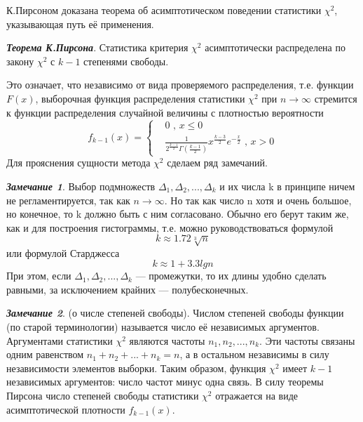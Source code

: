 \documentclass[12pt]{article}
\begin{document}
	К.Пирсоном доказана теорема об асимптотическом поведении статистики $\chi^{2}$, указывающая путь её применения.
	
	\textbf{\textit{Теорема К.Пирсона}}. Статистика критерия $\chi^{2}$ асимптотически распределена по закону $\chi^{2}$ с $k-1$ степенями свободы.
	
	Это означает, что независимо от вида проверяемого распределения, т.е. функции $F(x)$, выборочная функция распределения статистики $\chi^{2}$ при $n \rightarrow \infty$  стремится к функции распределения случайной величины с плотностью вероятности 
	\begin{equation}
		f_{k - 1}(x) = 
		\begin{cases}
			& 0 \text{ , } x  \leq 0  \\ 
			& \frac{1}{2^{\frac{k-1}{2}}\Gamma(\frac{k-1}{2})}x^{\frac{k-3}{2}}e^{-\frac{x}{2}}
			\text{ , } x>0 
		\end{cases}
		\label{f_k-1}
	\end{equation}
	Для прояснения сущности метода $\chi^{2}$ сделаем ряд замечаний.
	
	\textbf{\textit{Замечание 1}}. Выбор подмножеств $\Delta_{1},\Delta_{2}, ... ,\Delta_{k}$ и их числа k в принципе ничем не регламентируется, так как $n \rightarrow \infty$. Но так как число n хотя и очень большое, но конечное, то k должно быть с ним согласовано. Обычно его берут таким же, как и для построения гистограммы, т.е. можно руководствоваться формулой
	\begin{equation}
		k \approx 1.72\sqrt[3]{n}
		\label{k_1}
	\end{equation}
	или формулой Старджесса
	\begin{equation}
		k \approx 1 + 3.3lgn
	\end{equation}
	При этом, если  $\Delta_{1},\Delta_{2}, ... ,\Delta_{k}$ — промежутки, то их длины удобно сделать равными, за исключением крайних — полубесконечных.
	
	\textbf{\textit{Замечание 2}}. (о числе степеней свободы).
	Числом степеней свободы функции (по старой терминологии) называется число её независимых аргументов. Аргументами статистики $\chi^{2}$ являются частоты $n_{1},n_{2}, ... ,n_{k}$. Эти частоты связаны одним равенством $n_{1} + n_{2} + ... + n_{k}  = n$, а в остальном независимы в силу независимости элементов выборки. Таким образом, функция $\chi^{2}$  имеет $k-1$ независимых аргументов: число частот минус одна связь. В силу теоремы Пирсона число степеней свободы статистики $\chi^{2}$  отражается на виде асимптотической плотности $f_{k - 1}(x)$.
	
\end{document}
